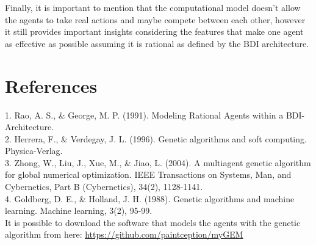 \documentclass[a4paper]{article}
\begin{document}
Finally, it is important to mention that the computational model doesn't allow the agents to take real actions and maybe compete between each other, however it still provides important insights considering the features that make one agent as effective as possible assuming it is rational as defined by the BDI architecture.


\section{References}

1. Rao, A. S., \& George, M. P. (1991). Modeling Rational Agents within a BDI-Architecture. \\

2. Herrera, F., \& Verdegay, J. L. (1996). Genetic algorithms and soft computing. Physica-Verlag. \\

3. Zhong, W., Liu, J., Xue, M., \& Jiao, L. (2004). A multiagent genetic algorithm for global numerical optimization. IEEE Transactions on Systems, Man, and Cybernetics, Part B (Cybernetics), 34(2), 1128-1141. \\

4. Goldberg, D. E., \& Holland, J. H. (1988). Genetic algorithms and machine learning. Machine learning, 3(2), 95-99. \\

It is possible to download the software that models the agents with the genetic algorithm from here: \url{https://github.com/paintception/myGEM}
\end{document}
